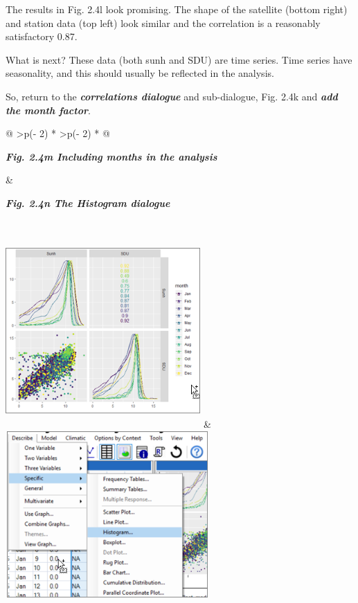 \documentclass[
  letterpaper,
  DIV=11,
  numbers=noendperiod]{scrreprt}
\begin{document}
The results in Fig. 2.4l look promising. The shape of the satellite
(bottom right) and station data (top left) look similar and the
correlation is a reasonably satisfactory 0.87.

What is next? These data (both sunh and SDU) are time series. Time
series have seasonality, and this should usually be reflected in the
analysis.

So, return to the \textbf{\emph{correlations dialogue}} and
sub-dialogue, Fig. 2.4k and \textbf{\emph{add the month factor}}.

\begin{longtable}[]{@{}
  >{\centering\arraybackslash}p{(\columnwidth - 2\tabcolsep) * }
  >{\centering\arraybackslash}p{(\columnwidth - 2\tabcolsep) * }@{}}
\toprule\noalign{}
\begin{minipage}[b]{\linewidth}\centering
\textbf{\emph{Fig. 2.4m Including months in the analysis}}
\end{minipage} & \begin{minipage}[b]{\linewidth}\centering
\textbf{\emph{Fig. 2.4n The Histogram dialogue}}
\end{minipage} \\
\midrule\noalign{}
\endhead
\bottomrule\noalign{}
\endlastfoot
\includegraphics[width=2.931in,height=2.931in]{figures/Fig2.4m.png} &
\includegraphics[width=3.064in,height=2.494in]{figures/Fig2.4n.png} \\
\end{longtable}
\end{document}
